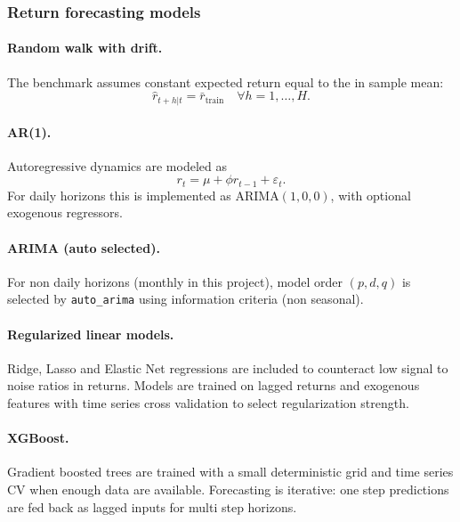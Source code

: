 \documentclass[11pt,a4paper]{article}
\begin{document}
\subsubsection{Return forecasting models}
\paragraph{Random walk with drift.} The benchmark assumes constant expected return equal to the in sample mean:
\begin{equation}
\hat r_{t+h|t} = \bar r_{\text{train}} \quad \forall h=1,\dots,H.
\end{equation}

\paragraph{AR(1).} Autoregressive dynamics are modeled as
\begin{equation}
 r_t = \mu + \phi r_{t-1} + \varepsilon_t.
\end{equation}
For daily horizons this is implemented as ARIMA$(1,0,0)$, with optional exogenous regressors.

\paragraph{ARIMA (auto selected).} For non daily horizons (monthly in this project), model order $(p,d,q)$ is selected by \texttt{auto\_arima} using information criteria (non seasonal).

\paragraph{Regularized linear models.} Ridge, Lasso and Elastic Net regressions are included to counteract low signal to noise ratios in returns. Models are trained on lagged returns and exogenous features with time series cross validation to select regularization strength.

\paragraph{XGBoost.} Gradient boosted trees are trained with a small deterministic grid and time series CV when enough data are available. Forecasting is iterative: one step predictions are fed back as lagged inputs for multi step horizons.
\end{document}
